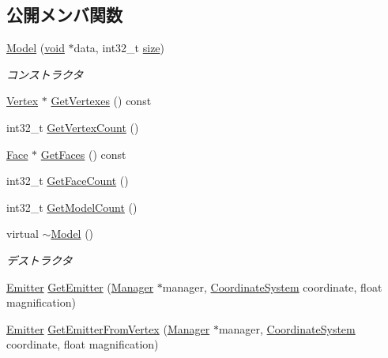 \subsection*{公開メンバ関数}
\begin{DoxyCompactItemize}
\item 
\mbox{\hyperlink{class_effekseer_1_1_model_a6e13732e632a25f8368b698b9c21e61d}{Model}} (\mbox{\hyperlink{namespace_effekseer_ab34c4088e512200cf4c2716f168deb56}{void}} $\ast$data, int32\+\_\+t \mbox{\hyperlink{namespace_effekseer_a73c68f3d33539d30844b9d1e058077f7}{size}})
\begin{DoxyCompactList}\small\item\em コンストラクタ \end{DoxyCompactList}\item 
\mbox{\hyperlink{struct_effekseer_1_1_model_1_1_vertex}{Vertex}} $\ast$ \mbox{\hyperlink{class_effekseer_1_1_model_a778016ed6ce14ce790a5d8515ea0f62a}{Get\+Vertexes}} () const
\item 
int32\+\_\+t \mbox{\hyperlink{class_effekseer_1_1_model_a25684a2a6e818195bc8b65cb5d74256c}{Get\+Vertex\+Count}} ()
\item 
\mbox{\hyperlink{struct_effekseer_1_1_model_1_1_face}{Face}} $\ast$ \mbox{\hyperlink{class_effekseer_1_1_model_a825371676a78e971cfe821a035eae651}{Get\+Faces}} () const
\item 
int32\+\_\+t \mbox{\hyperlink{class_effekseer_1_1_model_af53fdb52f8025801dab89cae4a88a4b7}{Get\+Face\+Count}} ()
\item 
int32\+\_\+t \mbox{\hyperlink{class_effekseer_1_1_model_ad91886d20e51178e39575730791d011f}{Get\+Model\+Count}} ()
\item 
virtual \mbox{\hyperlink{class_effekseer_1_1_model_a02266837426d39149d3eb56da7051c98}{$\sim$\+Model}} ()
\begin{DoxyCompactList}\small\item\em デストラクタ \end{DoxyCompactList}\item 
\mbox{\hyperlink{struct_effekseer_1_1_model_1_1_emitter}{Emitter}} \mbox{\hyperlink{class_effekseer_1_1_model_a2ac80c4050024433da6045a1085bb998}{Get\+Emitter}} (\mbox{\hyperlink{class_effekseer_1_1_manager}{Manager}} $\ast$manager, \mbox{\hyperlink{namespace_effekseer_ac8508f8823c5fcf36aac5d2ddee23765}{Coordinate\+System}} coordinate, float magnification)
\item 
\mbox{\hyperlink{struct_effekseer_1_1_model_1_1_emitter}{Emitter}} \mbox{\hyperlink{class_effekseer_1_1_model_a3ae42d789d1d4cd2166505e8e574b3d5}{Get\+Emitter\+From\+Vertex}} (\mbox{\hyperlink{class_effekseer_1_1_manager}{Manager}} $\ast$manager, \mbox{\hyperlink{namespace_effekseer_ac8508f8823c5fcf36aac5d2ddee23765}{Coordinate\+System}} coordinate, float magnification)

\end{DoxyCompactItemize}

